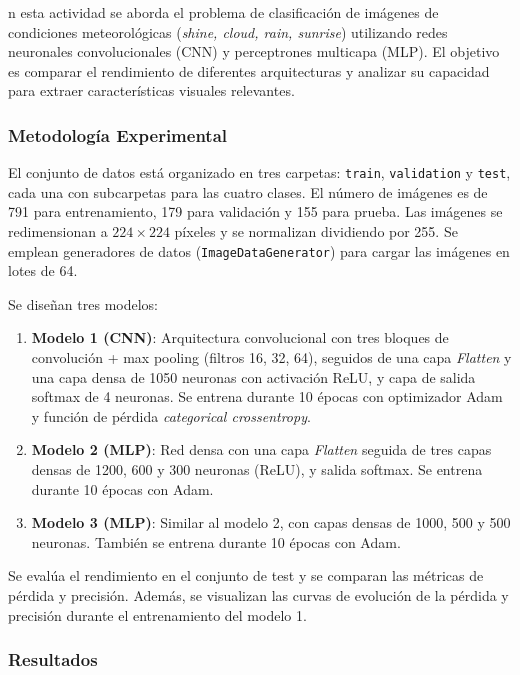 \documentclass[12pt]{article}
\begin{document}
n esta actividad se aborda el problema de clasificación de imágenes de condiciones meteorológicas (\textit{shine, cloud, rain, sunrise}) utilizando redes neuronales convolucionales (CNN) y perceptrones multicapa (MLP). El objetivo es comparar el rendimiento de diferentes arquitecturas y analizar su capacidad para extraer características visuales relevantes.

\subsubsection*{Metodología Experimental}

El conjunto de datos está organizado en tres carpetas: \texttt{train}, \texttt{validation} y \texttt{test}, cada una con subcarpetas para las cuatro clases. El número de imágenes es de 791 para entrenamiento, 179 para validación y 155 para prueba. Las imágenes se redimensionan a \(224 \times 224\) píxeles y se normalizan dividiendo por 255. Se emplean generadores de datos (\texttt{ImageDataGenerator}) para cargar las imágenes en lotes de 64.

Se diseñan tres modelos:

\begin{enumerate}
    \item \textbf{Modelo 1 (CNN)}: Arquitectura convolucional con tres bloques de convolución + max pooling (filtros 16, 32, 64), seguidos de una capa \textit{Flatten} y una capa densa de 1050 neuronas con activación ReLU, y capa de salida softmax de 4 neuronas. Se entrena durante 10 épocas con optimizador Adam y función de pérdida \textit{categorical crossentropy}.
    \item \textbf{Modelo 2 (MLP)}: Red densa con una capa \textit{Flatten} seguida de tres capas densas de 1200, 600 y 300 neuronas (ReLU), y salida softmax. Se entrena durante 10 épocas con Adam.
    \item \textbf{Modelo 3 (MLP)}: Similar al modelo 2, con capas densas de 1000, 500 y 500 neuronas. También se entrena durante 10 épocas con Adam.
\end{enumerate}

Se evalúa el rendimiento en el conjunto de test y se comparan las métricas de pérdida y precisión. Además, se visualizan las curvas de evolución de la pérdida y precisión durante el entrenamiento del modelo 1.

\subsubsection*{Resultados}
\end{document}
